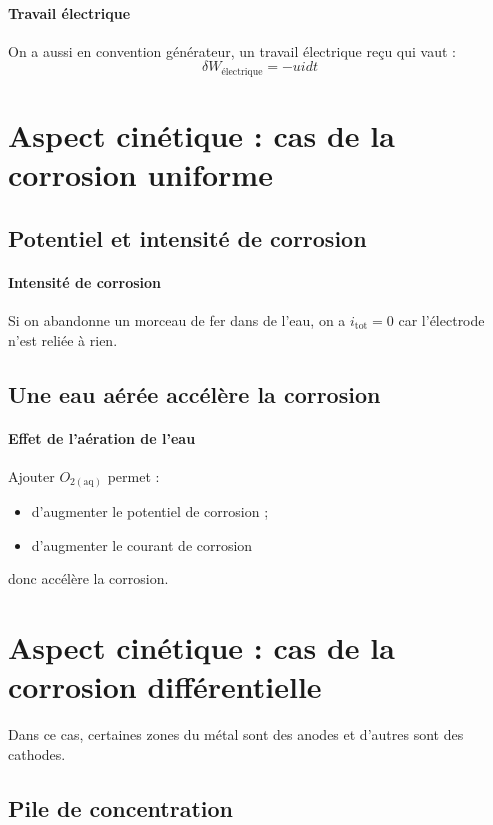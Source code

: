 \documentclass[french]{book}
\theoremstyle{plain}
\theoremstyle{definition}
\theoremstyle{remark}
\begin{document}
\paragraph{Travail électrique} On a aussi en convention générateur, un travail électrique reçu qui vaut : $$\delta W_\text{électrique}=-uidt$$

\section{Aspect cinétique : cas de la corrosion uniforme}

\subsection{Potentiel et intensité de corrosion}

\paragraph{Intensité de corrosion} Si on abandonne un morceau de fer dans de l'eau, on a $i_\text{tot}=0$ car l'électrode n'est reliée à rien.

\subsection{Une eau aérée accélère la corrosion}

\paragraph{Effet de l'aération de l'eau} Ajouter $O_{2(\text{aq})}$ permet :\begin{itemize}
	\item d'augmenter le potentiel de corrosion ;
	\item d'augmenter le courant de corrosion
\end{itemize} donc accélère la corrosion.

\section{Aspect cinétique : cas de la corrosion différentielle}

Dans ce cas, certaines zones du métal sont des anodes et d'autres sont des cathodes.

\subsection{Pile de concentration}
\end{document}
